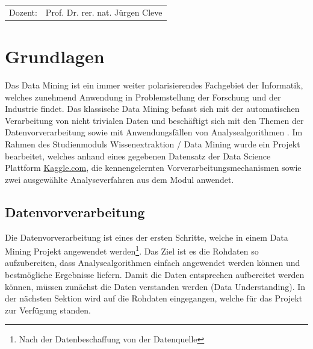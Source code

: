 \documentclass[12pt,					%
							 oneside,			%
							 a4paper,			%
							 halfparskip,		%
							 liststotoc,			%
							 bibtotoc,			%
							 fleqn,				%
							 pointlessnumbers]	%
							 {scrreprt}
\newcommand{\Betreuer}{Prof. Dr. rer. nat. Jürgen Cleve}
\newcommand{\blankpage}{
	\newpage
}
\begin{document}
\begin{titlepage}
\begin{center}
\begin{table}[b]
\begin{tabular}{rl}
					Dozent: & \Betreuer \\

				\end{tabular}
			\end{table}
		\end{center}
	\end{titlepage}

	\onehalfspacing 					%
	

	
\newpage

\tableofcontents 					%
	
\chapter{Grundlagen}

Das Data Mining ist ein immer weiter polarisierendes Fachgebiet der Informatik, welches zunehmend Anwendung in Problemstellung der Forschung und der Industrie findet. Das klassische Data Mining befasst sich mit der automatischen Verarbeitung von nicht trivialen Daten und beschäftigt sich mit den Themen der Datenvorverarbeitung sowie mit Anwendungsfällen von Analysealgorithmen \cite{Cleve2020}. Im Rahmen des Studienmoduls \glqq{}Wissenextraktion / Data Mining\grqq{} wurde ein Projekt bearbeitet, welches anhand eines gegebenen Datensatz der Data Science Plattform \href{www.kaggle.com}{Kaggle.com}, die kennengelernten Vorverarbeitungsmechanismen sowie zwei ausgewählte Analyseverfahren aus dem Modul anwendet. 

	\section{Datenvorverarbeitung}
	Die Datenvorverarbeitung ist eines der ersten Schritte, welche in einem Data Mining Projekt angewendet werden\footnote{Nach der Datenbeschaffung von der Datenquelle}. Das Ziel ist es die Rohdaten so aufzubereiten, dass Analysealgorithmen einfach angewendet werden können und bestmögliche Ergebnisse liefern.
	Damit die Daten entsprechen aufbereitet werden können, müssen zunächst die Daten verstanden werden (Data Understanding). In der nächsten Sektion wird auf die Rohdaten eingegangen, welche für das Projekt zur Verfügung standen.
	\newpage
\end{document}

